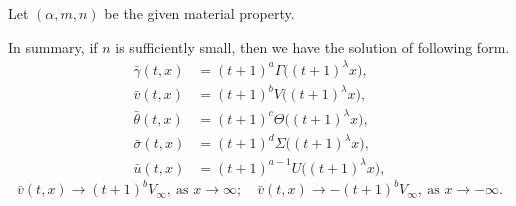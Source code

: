 \documentclass{beamer}
\def\bG{\bar{\Gamma}}
\def\bS{\bar{\Sigma}}
\def\bV{\bar{V}}
\def\bU{\bar{U}}
\def\bg{{\bar{\gamma}}}
\def\bv{{\bar{v}}}
\def\bth{{\bar{\theta}}}
\def\bs{{\bar{\sigma}}}
\def\bu{{\bar{u}}}
\begin{document}
% 

\begin{frame}
Let $(\alpha,m,n)$ be the given material property.

In summary, %
if $n$ is sufficiently small, then we have the solution of following form.
\begin{equation*} %
\begin{aligned}
 \bg(t,x) &= (t+1)^a\Gamma\big((t+1)^\lambda x\big), \\
 \bv(t,x) &= (t+1)^b V\big((t+1)^\lambda x\big), \\
 \bth(t,x) &= (t+1)^c\Theta\big((t+1)^\lambda x\big),\\
 \bs(t,x) &= (t+1)^d\Sigma\big((t+1)^\lambda x\big), \\
 \bu(t,x) &= (t+1)^{a-1}U\big((t+1)^\lambda x\big),
\end{aligned}
\end{equation*}
$$ \bv(t,x) \rightarrow (t+1)^b V_\infty, \: \text{as $x \rightarrow \infty$}; \quad \bv(t,x) \rightarrow -(t+1)^b V_\infty, \: \text{as $x \rightarrow -\infty$}.$$
\vfill
\end{frame}      
\end{document}
